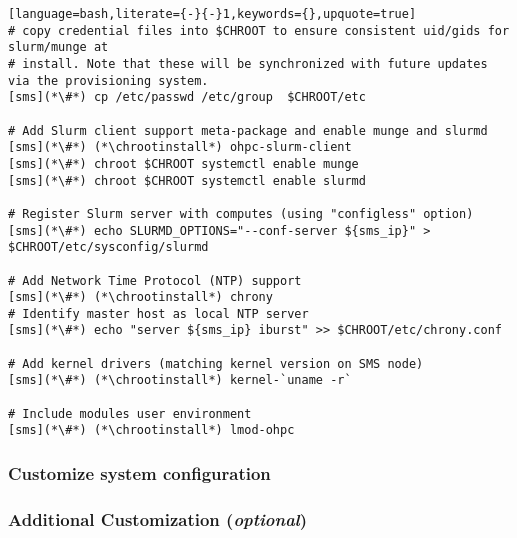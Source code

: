 \documentclass[letterpaper]{article}
\newcommand{\chrootinstall}{dnf -y --installroot=\$CHROOT install}
\begin{document}
\begin{lstlisting}[language=bash,literate={-}{-}1,keywords={},upquote=true]
# copy credential files into $CHROOT to ensure consistent uid/gids for slurm/munge at
# install. Note that these will be synchronized with future updates via the provisioning system.
[sms](*\#*) cp /etc/passwd /etc/group  $CHROOT/etc

# Add Slurm client support meta-package and enable munge and slurmd
[sms](*\#*) (*\chrootinstall*) ohpc-slurm-client
[sms](*\#*) chroot $CHROOT systemctl enable munge
[sms](*\#*) chroot $CHROOT systemctl enable slurmd

# Register Slurm server with computes (using "configless" option)
[sms](*\#*) echo SLURMD_OPTIONS="--conf-server ${sms_ip}" > $CHROOT/etc/sysconfig/slurmd

# Add Network Time Protocol (NTP) support
[sms](*\#*) (*\chrootinstall*) chrony
# Identify master host as local NTP server
[sms](*\#*) echo "server ${sms_ip} iburst" >> $CHROOT/etc/chrony.conf

# Add kernel drivers (matching kernel version on SMS node)
[sms](*\#*) (*\chrootinstall*) kernel-`uname -r`

# Include modules user environment
[sms](*\#*) (*\chrootinstall*) lmod-ohpc
\end{lstlisting}

\subsubsection{Customize system configuration} \label{sec:master_customization}







\subsubsection{Additional Customization ({\em optional})} \label{sec:addl_customizations}

\end{document}
